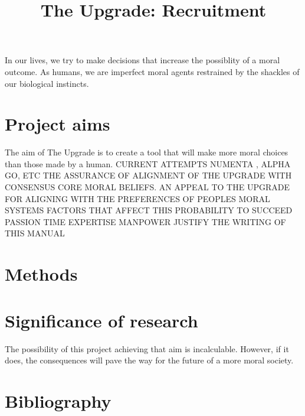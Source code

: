 \documentclass[12pt]{article}
\title{The Upgrade: Recruitment}
\date{\vspace{-5ex}}
\author{\vspace{-5ex}}
\begin{document}
\maketitle

In our lives, we try to make decisions that increase the possiblity of a moral outcome. As humans, we are imperfect moral agents restrained by the shackles of our biological instincts. 

\section*{Project aims}
The aim of The Upgrade is to create a tool that will make more moral choices than those made by a human. 
CURRENT ATTEMPTS
NUMENTA \cite{numentahome}, ALPHA GO, ETC
THE ASSURANCE OF ALIGNMENT OF THE UPGRADE WITH CONSENSUS CORE MORAL BELIEFS.
AN APPEAL TO THE UPGRADE FOR ALIGNING WITH THE PREFERENCES OF PEOPLES MORAL SYSTEMS
FACTORS THAT AFFECT THIS PROBABILITY TO SUCCEED
PASSION
TIME
EXPERTISE
MANPOWER
JUSTIFY THE WRITING OF THIS MANUAL 

\section*{Methods}
\section*{Significance of research}
The possibility of this project achieving that aim is incalculable. However, if it does, the consequences will pave the way for the future of a more moral society.

\section*{Bibliography}

\end{document}
